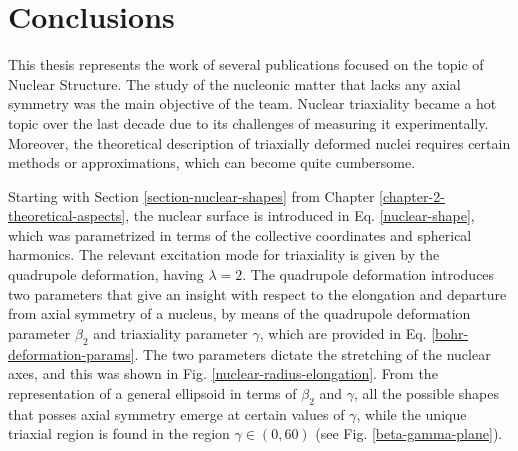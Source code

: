 \chapter{Conclusions}
\label{chapter-8-conclusions}

This thesis represents the work of several publications focused on the topic of Nuclear Structure. The study of the nucleonic matter that lacks any axial symmetry was the main objective of the team. Nuclear triaxiality became a hot topic over the last decade due to its challenges of measuring it experimentally. Moreover, the theoretical description of triaxially deformed nuclei requires certain methods or approximations, which can become quite cumbersome.

Starting with Section \ref{section-nuclear-shapes} from Chapter \ref{chapter-2-theoretical-aspects}, the nuclear surface is introduced in Eq. \ref{nuclear-shape}, which was parametrized in terms of the collective coordinates and spherical harmonics. The relevant excitation mode for triaxiality is given by the quadrupole deformation, having $\lambda=2$. The quadrupole deformation introduces two parameters that give an insight with respect to the elongation and departure from axial symmetry of a nucleus, by means of the quadrupole deformation parameter $\beta_2$ and triaxiality parameter $\gamma$, which are provided in Eq. \ref{bohr-deformation-params}. The two parameters dictate the stretching of the nuclear axes, and this was shown in Fig. \ref{nuclear-radius-elongation}. From the representation of a general ellipsoid in terms of $\beta_2$ and $\gamma$, all the possible shapes that posses axial symmetry emerge at certain values of $\gamma$, while the unique triaxial region is found in the region $\gamma\in(0,60)$ (see Fig. \ref{beta-gamma-plane}).

